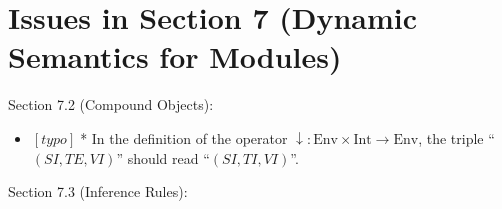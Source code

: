 \documentclass{article}
\newcommand{\m}[1]{$[\mathit{#1}]\;$}
\newcommand{\typo}{\m{typo}}
\begin{document}
\section{Issues in Section 7 (Dynamic Semantics for Modules)}
\label{bugschapter7}

Section 7.2 (Compound Objects):
\nopagebreak

\begin{itemize}
\item \typo * In the definition of the operator ${\downarrow}:\mbox{Env}\times\mbox{Int}\to\mbox{Env}$, the triple ``$(\mathit{SI},\mathit{TE},\mathit{VI})$'' should read ``$(\mathit{SI},\mathit{TI},\mathit{VI})$''.
\end{itemize}


Section 7.3 (Inference Rules):
\nopagebreak
\end{document}
